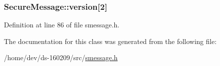 \hypertarget{class_secure_message_a13da5a2bfabeba96f2b0e8beafad4404}{}
\subsubsection[{version}]{ Secure\+Message\+::version\mbox{[}2\mbox{]}}\label{class_secure_message_a13da5a2bfabeba96f2b0e8beafad4404}


Definition at line 86 of file smessage.\+h.



The documentation for this class was generated from the following file\+:\begin{DoxyCompactItemize}
\item 
/home/dev/ds-\/160209/src/\hyperlink{smessage_8h}{smessage.\+h}\end{DoxyCompactItemize}
